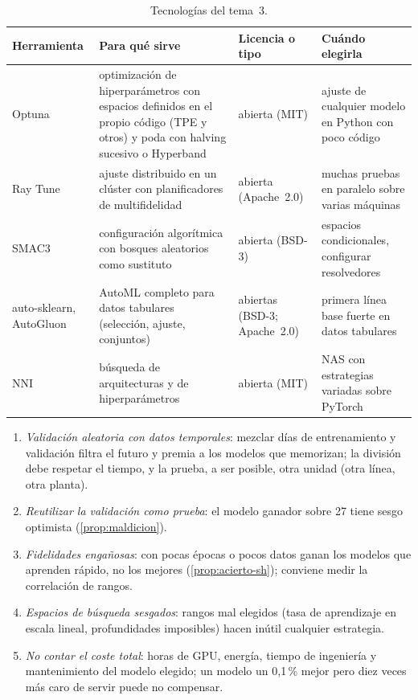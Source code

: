 \begin{table}[h]
\centering\small
\caption{Tecnologías del tema~3.}\label{tab:tec3}
\begin{tabularx}{\textwidth}{@{}>{\raggedright\arraybackslash}p{2.5cm}>{\raggedright\arraybackslash}X>{\raggedright\arraybackslash}p{2.1cm}>{\raggedright\arraybackslash}X@{}}
\toprule
Herramienta & Para qué sirve & Licencia o tipo & Cuándo elegirla \\
\midrule
Optuna~\cite{optuna} & optimización de hiperparámetros con espacios definidos en el propio código (TPE y otros) y poda con halving sucesivo o Hyperband & abierta (MIT) & ajuste de cualquier modelo en Python con poco código \\
Ray Tune~\cite{ray} & ajuste distribuido en un clúster con planificadores de multifidelidad & abierta (Apache~2.0) & muchas pruebas en paralelo sobre varias máquinas \\
SMAC3 & configuración algorítmica con bosques aleatorios como sustituto & abierta (BSD-3) & espacios condicionales, configurar resolvedores \\
auto-sklearn, AutoGluon & AutoML completo para datos tabulares (selección, ajuste, conjuntos) & abiertas (BSD-3; Apache~2.0) & primera línea base fuerte en datos tabulares \\
NNI & búsqueda de arquitecturas y de hiperparámetros & abierta (MIT) & NAS con estrategias variadas sobre PyTorch \\
\bottomrule
\end{tabularx}
\end{table}

\begin{observacion}\label{obs:errores3}
\begin{enumerate}[label=(\alph*)]
  \item \emph{Validación aleatoria con datos temporales}: mezclar días de entrenamiento y validación filtra el futuro y premia a los modelos que memorizan; la división debe respetar el tiempo, y la prueba, a ser posible, otra unidad (otra línea, otra planta).
  \item \emph{Reutilizar la validación como prueba}: el modelo ganador sobre 27 tiene sesgo optimista (\cref{prop:maldicion}).
  \item \emph{Fidelidades engañosas}: con pocas épocas o pocos datos ganan los modelos que aprenden rápido, no los mejores (\cref{prop:acierto-sh}); conviene medir la correlación de rangos.
  \item \emph{Espacios de búsqueda sesgados}: rangos mal elegidos (tasa de aprendizaje en escala lineal, profundidades imposibles) hacen inútil cualquier estrategia.
  \item \emph{No contar el coste total}: horas de GPU, energía, tiempo de ingeniería y mantenimiento del modelo elegido; un modelo un 0{,}1\,\% mejor pero diez veces más caro de servir puede no compensar.
\end{enumerate}
\end{observacion}

